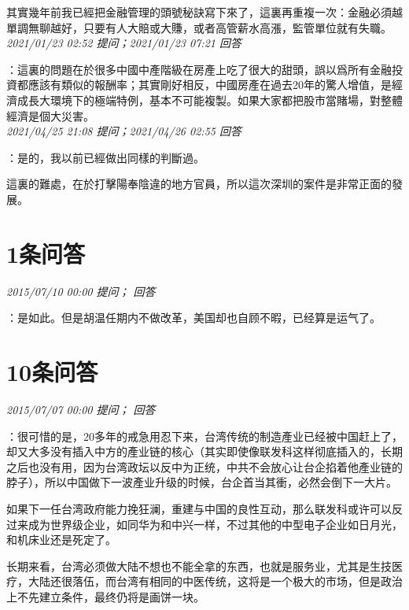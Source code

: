 \documentclass[twocolumn]{ctexart}
\begin{document}
其實幾年前我已經把金融管理的頭號秘訣寫下來了，這裏再重複一次：金融必須越單調無聊越好，只要有人大賠或大賺，或者高管薪水高漲，監管單位就有失職。
\\

\textit{\hfill\noindent\small 2021/01/23 02:52 提问；2021/01/23 07:21 回答}

：這裏的問題在於很多中國中產階級在房產上吃了很大的甜頭，誤以爲所有金融投資都應該有類似的報酬率；其實剛好相反，中國房產在過去20年的驚人增值，是經濟成長大環境下的極端特例，基本不可能複製。如果大家都把股市當賭場，對整體經濟是個大災害。
\\

\textit{\hfill\noindent\small 2021/04/25 21:08 提问；2021/04/26 02:55 回答}

：是的，我以前已經做出同樣的判斷過。

這裏的難處，在於打擊陽奉陰違的地方官員，所以這次深圳的案件是非常正面的發展。
\\

\section{1条问答}

\textit{\hfill\noindent\small 2015/07/10 00:00 提问； 回答}

：是如此。但是胡温任期内不做改革，美国却也自顾不暇，已经算是运气了。\\

\section{10条问答}

\textit{\hfill\noindent\small 2015/07/07 00:00 提问； 回答}

：很可惜的是，20多年的戒急用忍下来，台湾传统的制造產业已经被中国赶上了，却又大多没有插入中方的產业链的核心（其实即使像联发科这样彻底插入的，长期之后也没有用，因为台湾政坛以反中为正统，中共不会放心让台企掐着他產业链的脖子），所以中国做下一波產业升级的时候，台企首当其衝，必然会倒下一大片。

如果下一任台湾政府能力挽狂澜，重建与中国的良性互动，那么联发科或许可以反过来成为世界级企业，如同华为和中兴一样，不过其他的中型电子企业如日月光，和机床业还是死定了。

长期来看，台湾必须做大陆不想也不能全拿的东西，也就是服务业，尤其是生技医疗，大陆还很落伍，而台湾有相同的中医传统，这将是一个极大的市场，但是政治上不先建立条件，最终仍将是画饼一块。\\
\end{document}
